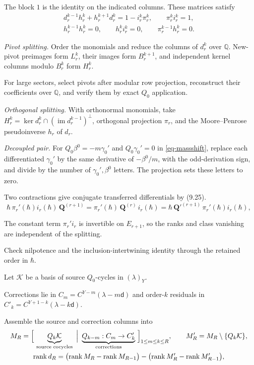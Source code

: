 \documentclass[11pt]{article}
\numberwithin{equation}{section}
\numberwithin{figure}{section}
\numberwithin{table}{section}
\begin{document}
The block $1$ is the identity on the indicated columns. These matrices satisfy
\begin{equation}\label{eq-page-matrix-checks}
\begin{gathered}
d_r^{k-1}h_r^k+h_r^{k+1}d_r^k=1-i_r^k\pi_r^k,
\qquad \pi_r^ki_r^k=1,\\
h_r^{k-1}h_r^k=0,\qquad h_r^ki_r^k=0,
\qquad \pi_r^{k-1}h_r^k=0.
\end{gathered}
\end{equation}

\emph{Pivot splitting.} Order the monomials and reduce the columns of $d_r^k$ over $\mathbb Q$. New-pivot preimages form $L_r^k$, their images form $B_r^{k+1}$, and independent kernel columns modulo $B_r^k$ form $H_r^k$.

For large sectors, select pivots after modular row projection, reconstruct their coefficients over $\mathbb Q$, and verify them by exact $Q_0$ application.

\emph{Orthogonal splitting.} With orthonormal monomials, take $H_r^k=\ker d_r^k\cap(\operatorname{im}d_r^{k-1})^\perp$, orthogonal projection $\pi_r$, and the Moore--Penrose pseudoinverse $h_r$ of $d_r$.

\emph{Decoupled pair.} For $Q_0\beta^0=-m\gamma_0'$ and $Q_0\gamma_0'=0$ in \eqref{eq-massshift}, replace each differentiated $\gamma_0'$ by the same derivative of $-\beta^0/m$, with the odd-derivation sign, and divide by the number of $\gamma_0',\beta^0$ letters. The projection sets these letters to zero.

Two contractions give conjugate transferred differentials by (9.25).
\begin{equation}\label{eq-page-choice}
\hbar\,\pi_r'(\hbar)i_r(\hbar)\,\mathbf Q^{(r+1)}
=\pi_r'(\hbar)\,\mathbf Q^{(r)}\,i_r(\hbar)
=\hbar\,\mathbf Q'^{(r+1)}\,\pi_r'(\hbar)i_r(\hbar),
\end{equation}

The constant term $\pi_r' i_r$ is invertible on $E_{r+1}$, so the ranks and class vanishing are independent of the splitting.

Check nilpotence and the inclusion-intertwining identity through the retained order in $\hbar$.

Let $\mathcal K$ be a basis of source $Q_0$-cycles in $(\lambda)_Y$.

Corrections lie in $C_m=C^{Y-m}(\lambda-m\mathsf d)$ and order-$k$ residuals in $C'_k=C^{Y+1-k}(\lambda-k\mathsf d)$.

Assemble the source and correction columns into
\begin{equation}\label{eq-E-rank}
\begin{gathered}M_R=\Bigl[\ \underbrace{Q_k\mathcal K}_{\text{source cocycles}}\ \Big|\ \underbrace{Q_{k-m}:C_m\to C'_k}_{\text{corrections}}\ \Bigr]_{1\le m\le k\le R},\qquad M'_R=M_R\setminus\{Q_k\mathcal K\},\\ \operatorname{rank}d_R=\bigl(\operatorname{rank}M_R-\operatorname{rank}M_{R-1}\bigr)-\bigl(\operatorname{rank}M'_R-\operatorname{rank}M'_{R-1}\bigr),\end{gathered}
\end{equation}
\end{document}
